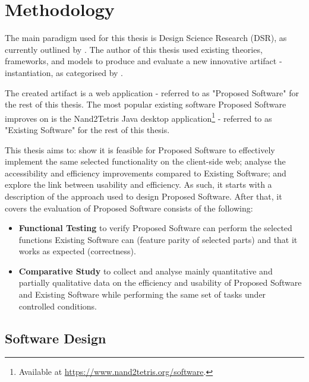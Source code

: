 \chapter{Methodology}
\label{Methodology}

The main paradigm used for this thesis is Design Science Research (DSR), as currently outlined by \textcite{brocke2020designscience}.
The author of this thesis used existing theories, frameworks, and models to produce and evaluate a new innovative artifact - instantiation, as categorised by \textcite{hevner2004designscience}.

The created artifact is a web application - referred to as "Proposed Software" for the rest of this thesis.
The most popular existing software Proposed Software improves on is the Nand2Tetris Java desktop application\footnote{Available at \url{https://www.nand2tetris.org/software}.} - referred to as "Existing Software" for the rest of this thesis.

This thesis aims to: show it is feasible for Proposed Software to effectively implement the same selected functionality on the client-side web; analyse the accessibility and efficiency improvements compared to Existing Software; and explore the link between usability and efficiency.
As such, it starts with a description of the approach used to design Proposed Software.
After that, it covers the evaluation of Proposed Software consists of the following:

\begin{itemize}
    \item \textbf{Functional Testing} to verify Proposed Software can perform the selected functions Existing Software can (feature parity of selected parts) and that it works as expected (correctness).
    \item \textbf{Comparative Study} to collect and analyse mainly quantitative and partially qualitative data on the efficiency and usability of Proposed Software and Existing Software while performing the same set of tasks under controlled conditions.
\end{itemize}

\section{Software Design}
\label{sec:software-design}

